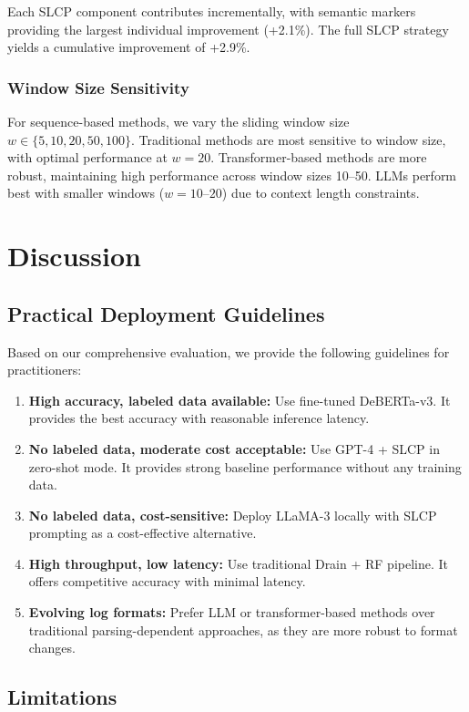 \documentclass[conference]{IEEEtran}
\begin{document}
Each SLCP component contributes incrementally, with semantic markers providing the largest individual improvement (+2.1\%). The full SLCP strategy yields a cumulative improvement of +2.9\%.

\subsubsection{Window Size Sensitivity}

For sequence-based methods, we vary the sliding window size $w \in \{5, 10, 20, 50, 100\}$. Traditional methods are most sensitive to window size, with optimal performance at $w=20$. Transformer-based methods are more robust, maintaining high performance across window sizes 10--50. LLMs perform best with smaller windows ($w=10$--$20$) due to context length constraints.

\section{Discussion}

\subsection{Practical Deployment Guidelines}

Based on our comprehensive evaluation, we provide the following guidelines for practitioners:

\begin{enumerate}
    \item \textbf{High accuracy, labeled data available:} Use fine-tuned DeBERTa-v3. It provides the best accuracy with reasonable inference latency.
    \item \textbf{No labeled data, moderate cost acceptable:} Use GPT-4 + SLCP in zero-shot mode. It provides strong baseline performance without any training data.
    \item \textbf{No labeled data, cost-sensitive:} Deploy LLaMA-3 locally with SLCP prompting as a cost-effective alternative.
    \item \textbf{High throughput, low latency:} Use traditional Drain + RF pipeline. It offers competitive accuracy with minimal latency.
    \item \textbf{Evolving log formats:} Prefer LLM or transformer-based methods over traditional parsing-dependent approaches, as they are more robust to format changes.
\end{enumerate}

\subsection{Limitations}
\end{document}
